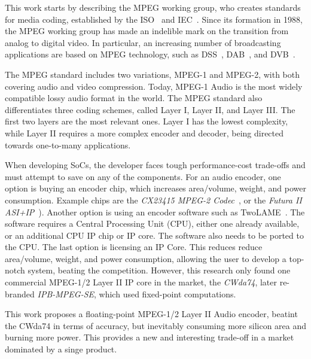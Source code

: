 
This work starts by describing the MPEG working group, who creates standards for
media coding, established by the ISO~\cite{iso} and IEC~\cite{iec}. Since its
formation in 1988, the MPEG working group has made an indelible mark on the
transition from analog to digital video. In particular, an increasing number of
broadcasting applications are based on MPEG technology, such as DSS~\cite{dss},
DAB~\cite{dab}, and DVB~\cite{dvb}.

The MPEG standard includes two variations, MPEG-1 and MPEG-2, with both covering
audio and video compression. Today, MPEG-1 Audio is the most widely compatible
lossy audio format in the world. The MPEG standard also differentiates three
coding schemes, called Layer I, Layer II, and Layer III.  The first two layers
are the most relevant ones. Layer I has the lowest complexity, while Layer II
requires a more complex encoder and decoder, being directed towards one-to-many
applications.

When developing SoCs, the developer faces tough performance-cost trade-offs and
must attempt to save on any of the components. For an audio encoder, one option
is buying an encoder chip, which increases area/volume, weight, and power
consumption. Example chips are the \textit{CX23415 MPEG-2 Codec}~\cite{cx23415},
or the \textit{Futura II ASI+IP}~\cite{futura}). Another option is using an
encoder software such as TwoLAME~\cite{twolame}. The software requires a Central
Processing Unit (CPU), either one already available, or an additional CPU IP
chip or IP core. The software also needs to be ported to the CPU. The last
option is licensing an IP Core. This reduces reduce area/volume, weight, and
power consumption, allowing the user to develop a top-notch system, beating the
competition. However, this research only found one commercial MPEG-1/2 Layer II
IP core in the market, the \textit{CWda74}, later
re-branded \textit{IPB-MPEG-SE}, which used fixed-point computations.

This work proposes a floating-point MPEG-1/2 Layer II Audio encoder, beatint the
CWda74 in terms of accuracy, but inevitably consuming more silicon area and
burning more power. This provides a new and interesting trade-off in a market
dominated by a singe product.
 
